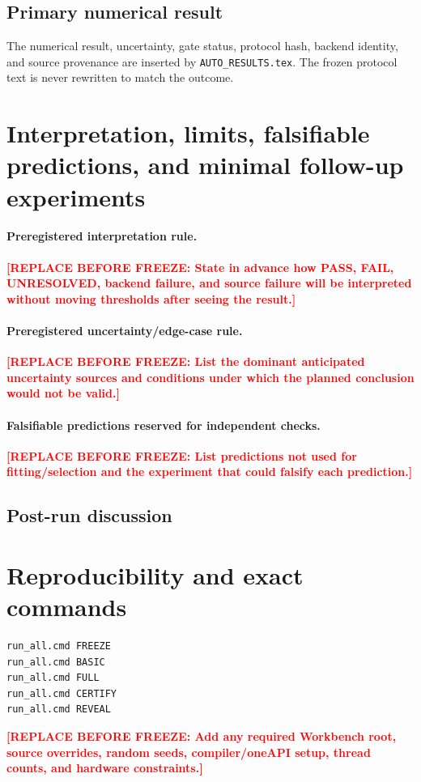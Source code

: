 \documentclass[11pt,a4paper]{article}
\newcommand{\SSTTODO}[1]{\ifmmode\text{\color{red}\bfseries TODO}\else\textcolor{red}{\textbf{[REPLACE BEFORE FREEZE: #1]}}\fi}
\begin{document}
\subsection{Primary numerical result}
The numerical result, uncertainty, gate status, protocol hash, backend identity, and source provenance are inserted by \texttt{AUTO\_RESULTS.tex}. The frozen protocol text is never rewritten to match the outcome.

\section{Interpretation, limits, falsifiable predictions, and minimal follow-up experiments}
\paragraph{Preregistered interpretation rule.}
\SSTTODO{State in advance how PASS, FAIL, UNRESOLVED, backend failure, and source failure will be interpreted without moving thresholds after seeing the result.}

\paragraph{Preregistered uncertainty/edge-case rule.}
\SSTTODO{List the dominant anticipated uncertainty sources and conditions under which the planned conclusion would not be valid.}

\paragraph{Falsifiable predictions reserved for independent checks.}
\SSTTODO{List predictions not used for fitting/selection and the experiment that could falsify each prediction.}

\subsection{Post-run discussion}

\section{Reproducibility and exact commands}
\begin{verbatim}
run_all.cmd FREEZE
run_all.cmd BASIC
run_all.cmd FULL
run_all.cmd CERTIFY
run_all.cmd REVEAL
\end{verbatim}
\SSTTODO{Add any required Workbench root, source overrides, random seeds, compiler/oneAPI setup, thread counts, and hardware constraints.}
\end{document}
